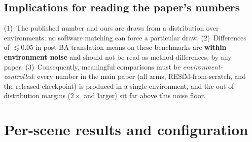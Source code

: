\documentclass{article}
\begin{document}
\subsection{Implications for reading the paper's numbers}\label{sec:implications}
(1)~The published number and ours are draws from a distribution over environments; no
software matching can force a particular draw. (2)~Differences of $\lesssim\!0.05$ in
post-BA translation means on these benchmarks are \textbf{within environment noise} and
should not be read as method differences, by any paper. (3)~Consequently, meaningful
comparisons must be \emph{environment-controlled}: every number in the main paper
(all arms, RESfM-from-scratch, and the released checkpoint) is produced in a single
environment, and the out-of-distribution margins ($2\times$ and larger) sit far above this
noise floor.


\section{Per-scene results and configuration}\label{app:perscene}
\end{document}
